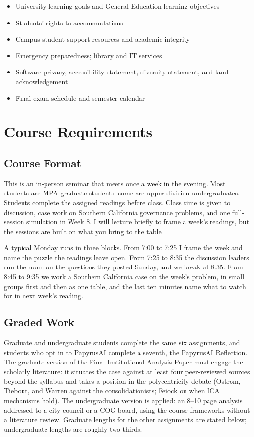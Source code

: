 \documentclass[12pt]{article}
\begin{document}
\begin{itemize}
\item University learning goals and General Education learning objectives
\item Students' rights to accommodations
\item Campus student support resources and academic integrity
\item Emergency preparedness; library and IT services
\item Software privacy, accessibility statement, diversity statement, and land acknowledgement
\item Final exam schedule and semester calendar
\end{itemize}

\section*{Course Requirements}

\subsection*{Course Format}
This is an in-person seminar that meets once a week in the evening. Most students are MPA graduate students; some are upper-division undergraduates. Students complete the assigned readings before class. Class time is given to discussion, case work on Southern California governance problems, and one full-session simulation in Week 8. I will lecture briefly to frame a week's readings, but the sessions are built on what you bring to the table.

A typical Monday runs in three blocks. From 7:00 to 7:25 I frame the week and name the puzzle the readings leave open. From 7:25 to 8:35 the discussion leaders run the room on the questions they posted Sunday, and we break at 8:35. From 8:45 to 9:35 we work a Southern California case on the week's problem, in small groups first and then as one table, and the last ten minutes name what to watch for in next week's reading.

\subsection*{Graded Work}

Graduate and undergraduate students complete the same six assignments, and students who opt in to PapyrusAI complete a seventh, the PapyrusAI Reflection. The graduate version of the Final Institutional Analysis Paper must engage the scholarly literature: it situates the case against at least four peer-reviewed sources beyond the syllabus and takes a position in the polycentricity debate (Ostrom, Tiebout, and Warren against the consolidationists; Feiock on when ICA mechanisms hold). The undergraduate version is applied: an 8--10 page analysis addressed to a city council or a COG board, using the course frameworks without a literature review. Graduate lengths for the other assignments are stated below; undergraduate lengths are roughly two-thirds.
\end{document}
